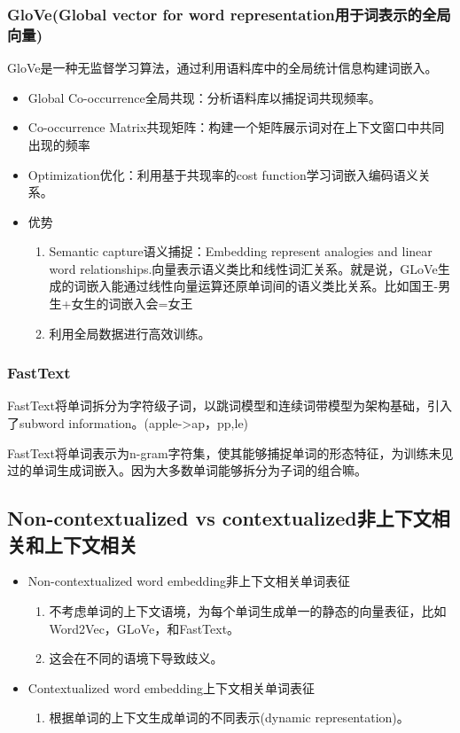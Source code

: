 \documentclass[UTF8]{ctexart}
\begin{document}
\subsubsection{GloVe(Global vector for word representation用于词表示的全局向量)}

GloVe是一种无监督学习算法，通过利用语料库中的全局统计信息构建词嵌入。
\begin{itemize}
    \item Global Co-occurrence全局共现：分析语料库以捕捉词共现频率。
    \item Co-occurrence Matrix共现矩阵：构建一个矩阵展示词对在上下文窗口中共同出现的频率
    \item Optimization优化：利用基于共现率的cost function学习词嵌入编码语义关系。
    \item 优势
    \begin{enumerate}
        \item Semantic capture语义捕捉：Embedding represent analogies and linear word relationships.向量表示语义类比和线性词汇关系。就是说，GLoVe生成的词嵌入能通过线性向量运算还原单词间的语义类比关系。比如国王-男生+女生的词嵌入会=女王
        \item 利用全局数据进行高效训练。
    \end{enumerate}
\end{itemize}

\subsubsection{FastText}

FastText将单词拆分为字符级子词，以跳词模型和连续词带模型为架构基础，引入了subword information。(apple->ap，pp,le)

FastText将单词表示为n-gram字符集，使其能够捕捉单词的形态特征，为训练未见过的单词生成词嵌入。因为大多数单词能够拆分为子词的组合嘛。

\subsection{Non-contextualized vs contextualized非上下文相关和上下文相关}

\begin{itemize}
    \item Non-contextualized word embedding非上下文相关单词表征
    
    \begin{enumerate}
        \item 不考虑单词的上下文语境，为每个单词生成单一的静态的向量表征，比如Word2Vec，GLoVe，和FastText。
        \item 这会在不同的语境下导致歧义。
    \end{enumerate}

    \item Contextualized word embedding上下文相关单词表征
    \begin{enumerate}
        \item 根据单词的上下文生成单词的不同表示(dynamic representation)。
    \end{enumerate}
\end{itemize}
\end{document}
